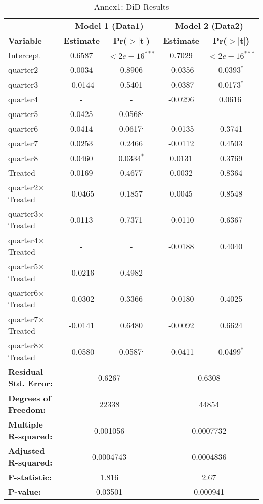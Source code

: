 \documentclass{article}
\begin{document}
\begin{table}[h!]
\centering
\caption{Annex1: DiD Results}
\label{tab:regression_comparison}
\begin{tabular}{lcccc}
\toprule
 & \multicolumn{2}{c}{\textbf{Model 1 (Data1)}} & \multicolumn{2}{c}{\textbf{Model 2 (Data2)}} \\
\cmidrule(lr){2-3} \cmidrule(lr){4-5}
\textbf{Variable} & \textbf{Estimate} & \textbf{Pr($>|$t$|$)} & \textbf{Estimate} & \textbf{Pr($>|$t$|$)} \\
\midrule
Intercept         & 0.6587 & $<2e-16^{***}$ & 0.7029 & $<2e-16^{***}$ \\
quarter2          & 0.0034 & 0.8906 & -0.0356 & 0.0393$^{*}$ \\
quarter3          & -0.0144 & 0.5401 & -0.0387 & 0.0173$^{*}$ \\
quarter4          & -      & -     & -0.0296 & 0.0616$^{.}$ \\
quarter5          & 0.0425 & 0.0568$^{.}$ & -      & - \\
quarter6          & 0.0414 & 0.0617$^{.}$ & -0.0135 & 0.3741 \\
quarter7          & 0.0253 & 0.2466 & -0.0112 & 0.4503 \\
quarter8          & 0.0460 & 0.0334$^{*}$ & 0.0131 & 0.3769 \\
Treated           & 0.0169 & 0.4677 & 0.0032 & 0.8364 \\
quarter2$\times$Treated & -0.0465 & 0.1857 & 0.0045 & 0.8548 \\
quarter3$\times$Treated & 0.0113 & 0.7371 & -0.0110 & 0.6367 \\
quarter4$\times$Treated & -      & -     & -0.0188 & 0.4040 \\
quarter5$\times$Treated & -0.0216 & 0.4982 & -      & - \\
quarter6$\times$Treated & -0.0302 & 0.3366 & -0.0180 & 0.4025 \\
quarter7$\times$Treated & -0.0141 & 0.6480 & -0.0092 & 0.6624 \\
quarter8$\times$Treated & -0.0580 & 0.0587$^{.}$ & -0.0411 & 0.0499$^{*}$ \\
\midrule
\multicolumn{1}{l}{\textbf{Residual Std. Error:}} & \multicolumn{2}{c}{0.6267} & \multicolumn{2}{c}{0.6308} \\
\multicolumn{1}{l}{\textbf{Degrees of Freedom:}} & \multicolumn{2}{c}{22338} & \multicolumn{2}{c}{44854} \\
\multicolumn{1}{l}{\textbf{Multiple R-squared:}} & \multicolumn{2}{c}{0.001056} & \multicolumn{2}{c}{0.0007732} \\
\multicolumn{1}{l}{\textbf{Adjusted R-squared:}} & \multicolumn{2}{c}{0.0004743} & \multicolumn{2}{c}{0.0004836} \\
\multicolumn{1}{l}{\textbf{F-statistic:}} & \multicolumn{2}{c}{1.816} & \multicolumn{2}{c}{2.67} \\
\multicolumn{1}{l}{\textbf{P-value:}} & \multicolumn{2}{c}{0.03501} & \multicolumn{2}{c}{0.000941} \\
\bottomrule
\end{tabular}
\end{table}
\end{document}
